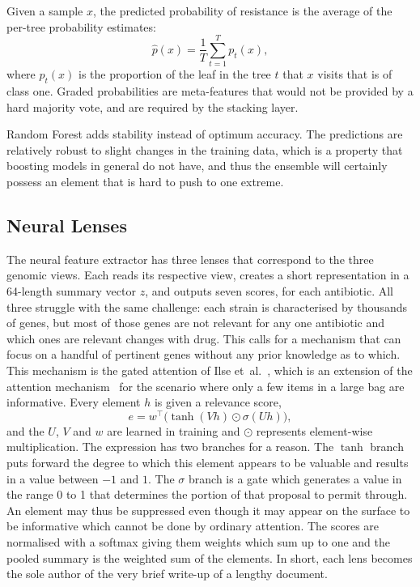 Given a sample $x$, the predicted probability of resistance is the average of the per-tree
probability estimates:
\begin{equation}
\hat{p}(x) = \frac{1}{T} \sum_{t=1}^{T} p_t(x),
\label{eq:rf_score}
\end{equation}
where $p_t(x)$ is the proportion of the leaf in the tree $t$ that $x$ visits that is of class
one. Graded probabilities are meta-features that would not be provided by a hard majority
vote, and are required by the stacking layer.

\vspace{1em}

Random Forest adds stability instead of optimum accuracy. The predictions are relatively
robust to slight changes in the training data, which is a property that boosting models in
general do not have, and thus the ensemble will certainly possess an element that is hard to
push to one extreme.

\FloatBarrier
\subsection{Neural Lenses}

The neural feature extractor has three lenses that correspond to the three genomic views.
Each reads its respective view, creates a short representation in a 64-length summary vector
$z$, and outputs seven scores, for each antibiotic. All three struggle with the same
challenge: each strain is characterised by thousands of genes, but most of those genes
are not relevant for any one antibiotic and which ones are relevant changes with drug. This
calls for a mechanism that can focus on a handful of pertinent genes without any prior
knowledge as to which. This mechanism is the gated attention of Ilse et\
al.~\cite{ilse2018attention}, which is an extension of the attention
mechanism~\cite{vaswani2017attention} for the scenario where only a few items in a large bag
are informative. Every element $h$ is given a relevance score,
\begin{equation}
e = w^\top \big(\tanh(V h) \odot \sigma(U h)\big),
\label{eq:gated_attn}
\end{equation}
and the $U$, $V$ and $w$ are learned in training and $\odot$ represents element-wise
multiplication. The expression has two branches for a reason. The $\tanh$ branch puts forward
the degree to which this element appears to be valuable and results in a value between $-1$
and $1$. The $\sigma$ branch is a gate which generates a value in the range 0 to 1 that
determines the portion of that proposal to permit through. An element may thus be suppressed
even though it may appear on the surface to be informative which cannot be done by ordinary
attention. The scores are normalised with a softmax giving them weights which sum up to one
and the pooled summary is the weighted sum of the elements. In short, each lens becomes the sole author of the very brief write-up of a lengthy document.

